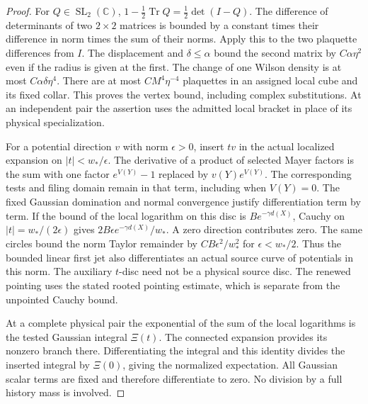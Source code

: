 \documentclass[11pt,letterpaper,reqno]{amsart}
\numberwithin{equation}{section}
\theoremstyle{definition}
\theoremstyle{remark}
\begin{document}
\begin{proof}
For $Q\in\operatorname{SL}_2(\mathbb C)$,
$1-\tfrac12\operatorname{Tr}Q=\tfrac12\det(I-Q)$.
The difference of determinants of two $2\times2$ matrices is
bounded by a constant times their difference in norm times the
sum of their norms. Apply this to the two plaquette differences
from $I$. The displacement and $\delta\le\alpha$ bound the second matrix by $C\alpha\eta^2$ even if the radius is given at the first. The change of one Wilson density is at most
$C\alpha\delta\eta^4$. There are at most $C M^4\eta^{-4}$
plaquettes in an assigned local cube and its fixed collar. This
proves the vertex bound, including complex substitutions. At an
independent pair the assertion uses the admitted local bracket in
place of its physical specialization.

For a potential direction $v$ with norm $\epsilon>0$, insert $t v$
in the actual localized expansion on $|t|<w_*/\epsilon$.
The derivative of a product of selected Mayer factors is the sum
with one factor $e^{V(Y)}-1$ replaced by $v(Y)e^{V(Y)}$.
The corresponding tests and filing domain remain in that term,
including when $V(Y)=0$. The fixed Gaussian domination and normal
convergence justify differentiation term by term. If the bound
of the local logarithm on this disc is $B e^{-\gamma d(X)}$,
Cauchy on $|t|=w_*/(2\epsilon)$ gives
$2 B\epsilon e^{-\gamma d(X)}/w_*$. A zero direction contributes
zero. The same circles bound the norm Taylor remainder by
$C B\epsilon^2/w_*^2$ for $\epsilon<w_*/2$. Thus the bounded
linear first jet also differentiates an actual source curve of
potentials in this norm. The auxiliary $t$-disc need not be a
physical source disc. The renewed pointing uses the stated
rooted pointing estimate, which is separate from the unpointed
Cauchy bound.

At a complete physical pair the exponential of the sum of the
local logarithms is the tested Gaussian integral $\Xi(t)$.
The connected expansion provides its nonzero branch there.
Differentiating the integral and this identity divides the
inserted integral by $\Xi(0)$, giving the normalized expectation.
All Gaussian scalar terms are fixed and therefore differentiate
to zero. No division by a full history mass is involved.
\end{proof}
\end{document}
